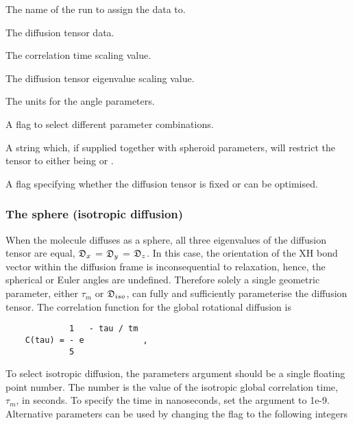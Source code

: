  The name of the run to assign the data to. 

  The diffusion tensor data. 

  The correlation time scaling value. 

  The diffusion tensor eigenvalue scaling value. 

  The units for the angle parameters. 

  A flag to select different parameter combinations. 

  A string which, if supplied together with spheroid parameters, will restrict the tensor to either being  or . 

  A flag specifying whether the diffusion tensor is fixed or can be optimised. 




\subsubsection{The sphere (isotropic diffusion)}

When the molecule diffuses as a sphere, all three eigenvalues of the diffusion tensor are equal, $\mathfrak{D}_x$ = $\mathfrak{D}_y$ = $\mathfrak{D}_z$.  In this case, the orientation of the XH bond vector within the diffusion frame is inconsequential to relaxation, hence, the spherical or Euler angles are undefined.  Therefore solely a single geometric parameter, either $\tau_m$ or $\mathfrak{D}_{iso}$, can fully and sufficiently parameterise the diffusion tensor.  The correlation function for the global rotational diffusion is


{\footnotesize \begin{verbatim}
             1   - tau / tm
    C(tau) = - e            ,
             5
\end{verbatim}}

To select isotropic diffusion, the parameters argument should be a single floating point number.  The number is the value of the isotropic global correlation time, $\tau_m$, in seconds. To specify the time in nanoseconds, set the  argument to 1e-9.  Alternative parameters can be used by changing the  flag to the following integers


